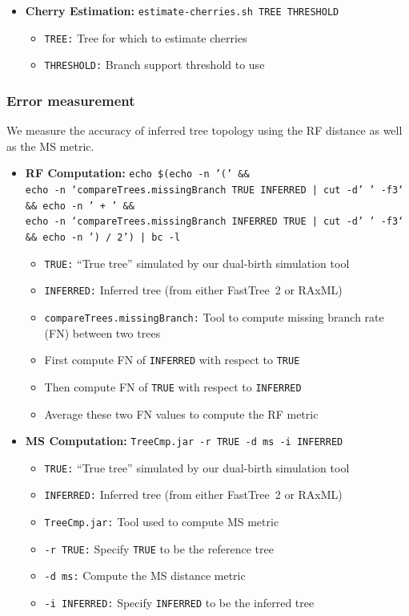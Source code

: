 \begin{itemize}
\item \textbf{Cherry Estimation:} \texttt{estimate-cherries.sh TREE THRESHOLD}
\begin{itemize}
\item \texttt{TREE:} Tree for which to estimate cherries
\item \texttt{THRESHOLD:} Branch support threshold to use
\end{itemize}
\end{itemize}

\subsubsection{Error measurement}
We measure the accuracy of inferred tree topology using the \gls{RF} distance as well as the \gls{MS} metric.

\begin{itemize}
\item \textbf{RF Computation:} \texttt{echo \$(echo -n '(' \&\&\\echo -n `compareTrees.missingBranch TRUE INFERRED | cut -d' ' -f3` \&\&\\echo -n ' + ' \&\&\\echo -n `compareTrees.missingBranch INFERRED TRUE | cut -d' ' -f3` \&\&\\echo -n ') / 2') | bc -l}
\begin{itemize}
\item \texttt{TRUE:} ``True tree'' simulated by our dual-birth simulation tool
\item \texttt{INFERRED:} Inferred tree (from either FastTree~2 or RAxML)
\item \texttt{compareTrees.missingBranch:} Tool to compute missing branch rate (FN) between two trees
\item First compute FN of \texttt{INFERRED} with respect to \texttt{TRUE}
\item Then compute FN of \texttt{TRUE} with respect to \texttt{INFERRED}
\item Average these two FN values to compute the RF metric
\end{itemize}

\item \textbf{\gls{MS} Computation:} \texttt{TreeCmp.jar -r TRUE -d ms -i INFERRED}
\begin{itemize}
\item \texttt{TRUE:} ``True tree'' simulated by our dual-birth simulation tool
\item \texttt{INFERRED:} Inferred tree (from either FastTree~2 or RAxML)
\item \texttt{TreeCmp.jar:} Tool used to compute MS metric~\cite{Bogdanowicz2012}
\item \texttt{-r TRUE:} Specify \texttt{TRUE} to be the reference tree
\item \texttt{-d ms:} Compute the MS distance metric
\item \texttt{-i INFERRED:} Specify \texttt{INFERRED} to be the inferred tree
\end{itemize}
\end{itemize}


